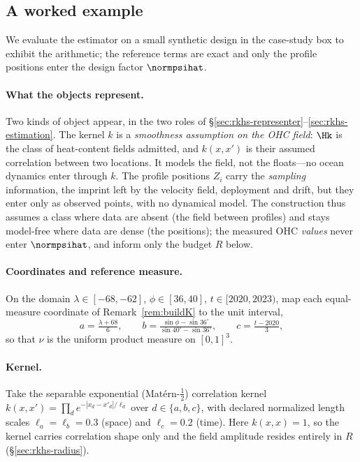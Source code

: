 \subsection{A worked example}
\label{sec:rkhs-example}

We evaluate the estimator on a small synthetic design in the case-study box to
exhibit the arithmetic; the reference terms are exact and only the profile
positions enter the design factor $\normpsihat$.

\paragraph{What the objects represent.}
Two kinds of object appear, in the two roles of
\S\ref{sec:rkhs-representer}--\ref{sec:rkhs-estimation}. The kernel $k$ is a
\emph{smoothness assumption on the OHC field}: $\Hk$ is the class of
heat-content fields admitted, and $k(x,x')$ is their assumed correlation between
two locations. It models the field, not the floats---no ocean dynamics enter
through $k$. The profile positions $Z_i$ carry the \emph{sampling} information,
the imprint left by the velocity field, deployment and drift, but they enter only
as observed points, with no dynamical model. The construction thus assumes a
class where data are absent (the field between profiles) and stays model-free
where data are dense (the positions); the measured OHC \emph{values} never enter
$\normpsihat$, and inform only the budget $R$ below.

\paragraph{Coordinates and reference measure.}
On the domain $\lambda\in[-68,-62]$, $\phi\in[36,40]$, $t\in[2020,2023)$, map
each equal-measure coordinate of Remark~\ref{rem:buildK} to the unit interval,
\[
  a=\tfrac{\lambda+68}{6},\qquad
  b=\tfrac{\sin\phi-\sin36^\circ}{\sin40^\circ-\sin36^\circ},\qquad
  c=\tfrac{t-2020}{3},
\]
so that $\nu$ is the uniform product measure on $[0,1]^3$.

\paragraph{Kernel.}
Take the separable exponential (Mat\'ern-$\tfrac12$) correlation kernel
$k(x,x')=\prod_{d}e^{-|x_d-x'_d|/\ell_d}$ over $d\in\{a,b,c\}$, with declared
normalized length scales $\ell_a=\ell_b=0.3$ (space) and $\ell_c=0.2$ (time). Here
$k(x,x)=1$, so the kernel carries correlation shape only and the field amplitude
resides entirely in $R$ (\S\ref{sec:rkhs-radius}).

